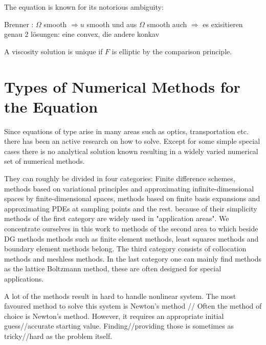 The \MA equation is known for its notorious ambiguity:
\begin{example}
\end{example}

Brenner\cite{Brenner2012} : $\Omega$ smooth $\Rightarrow u$ smooth \cite{Caffarelli1984} und aus $\Omega$ smooth auch $\Rightarrow$ es exisitieren genau 2 lösungen: eine convex, die andere konkav \cite{Courant1989}

A viscosity solution is unique if $F$ is elliptic by the comparison principle.


\section{Types of Numerical Methods for the \MA Equation}
Since equations of \MA type arise in many areas such as optics, transportation etc. there has been an active research on how to solve. Except for some simple special cases there is no analytical solution known resulting in a widely varied numerical set of numerical methods.

They can roughly be divided in four categories: Finite difference schemes, methods based on variational principles and approximating infinite-dimensional spaces by finite-dimensional spaces, methods based on finite basis expansions and approximating PDEs at sampling points and the rest.
because of their simplicity methods of the first category are widely used in "application areas". We concentrate ourselves in this work to methods of the second area to which beside DG methods methods such as finite element methods, least squares methods and boundary element methods belong.
The third category consists of collocation methods and meshless methods.
In the last category one can mainly find methods as the lattice Boltzmann method, these are often designed for special applications.

A lot of the methods result in hard to handle nonlinear system. The most favoured method to solve this system is Newton's method // Often the method of choice is Newton's method. However, it requires an appropriate initial guess//accurate starting value. Finding//providing those is sometimes as tricky//hard as the problem itself.
